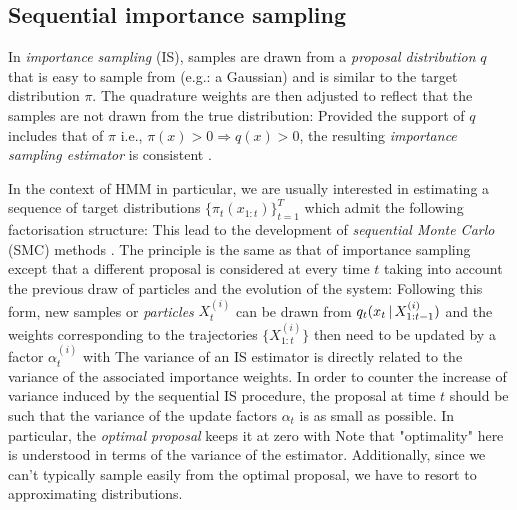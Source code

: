 \subsection{Sequential importance sampling}
In \emph{importance sampling} (IS), samples are drawn from a \emph{proposal distribution} $q$ that is easy to sample from (e.g.: a Gaussian) and is similar to the target distribution $\pi$. 
The quadrature weights are then adjusted to reflect that the samples are not drawn from the true distribution:
%
%
Provided the support of $q$ includes that of $\pi$ i.e., $\pi(x)>0\Rightarrow q(x)>0$, the resulting \emph{importance sampling estimator} is consistent \citep[chapter 3.3]{robert04}.

In the context of HMM in particular, we are usually interested in estimating a sequence of target distributions $\{\pi_{t}(x_{1:t})\}_{t=1}^{T}$ which admit the following factorisation structure:
%
%
This lead to the development of \emph{sequential Monte Carlo} (SMC) methods \citep[chapter 14.3]{robert04}. The principle is the same as that of importance sampling except that a different proposal is considered at every time $t$ taking into account the previous draw of particles and the evolution of the system:
%
%
Following this form, new samples or \emph{particles} $X^{(i)}_t$ can be drawn from $q_{t}(x_{t}\,|\, X^{(i)}_{1:t-1})$ and the weights corresponding to the trajectories $\{X^{(i)}_{1:t}\}$ then need to be updated by a factor $\alpha^{(i)}_{t}$ with
%
%
The variance of an IS estimator is directly related to the variance of the associated importance weights. In order to counter the increase of variance induced by the sequential IS procedure, the proposal at time $t$ should be such that the variance of the update factors $\alpha_t$ is as small as possible. In particular, the \emph{optimal proposal} \citep{doucet11} keeps it at zero with
Note that "optimality" here is understood in terms of the variance of the estimator. Additionally, since we can't typically sample easily from the optimal proposal, we have to resort to approximating distributions. 

